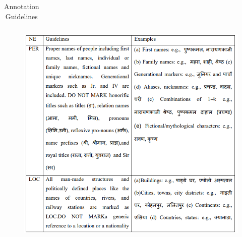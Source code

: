  
\begin{table}[H]
  
\caption{ Annotation Guidelines}
\label{tab:  Annotation Guidelines}
    \centering
    
    \begin{tabular}{|c|c|c|}
    \end{tabular}
    
    
\end{table}
\begin{figure}[H]
\centering
\includegraphics [scale=1.2]{img/Graphics/Annotation Guidelines1.png}

\end{figure}
